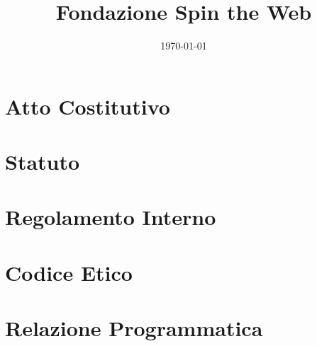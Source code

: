 \documentclass[11pt,a4paper]{article}
\title{Fondazione Spin the Web}
\author{}
\date{\today}
\begin{document}
\maketitle
\tableofcontents

\newpage
\section{Atto Costitutivo}


\newpage
\section{Statuto}


\newpage
\section{Regolamento Interno}


\newpage
\section{Codice Etico}


\newpage
\section{Relazione Programmatica}

\end{document}
